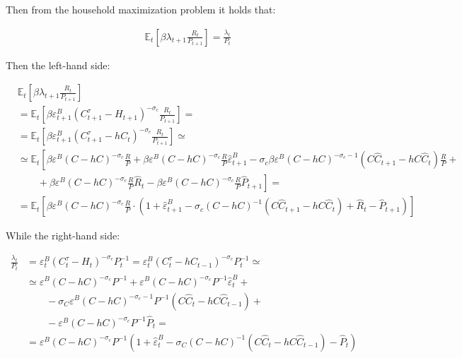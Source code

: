 \documentclass{pracamgr}
\numberwithin{equation}{section}
\begin{document}
Then from the household maximization problem it holds that:

\begin{align}
& \mathbb{E}_{t} \left[\beta \lambda_{t+1} \frac{R_{t}}{P_{t+1}} \right] = \frac{\lambda_{t}}{P_{t}} 
\end{align}

Then the left-hand side:

\begin{align}
& \mathbb{E}_{t} \left[\beta \lambda_{t+1} \frac{R_{t}}{P_{t+1}} \right]  \nonumber \\
& = \mathbb{E}_{t} \left[\beta \varepsilon_{t+1}^{B} \left( C_{t+1}^{\tau} - H_{t+1} \right)^{-\sigma_{c}} \frac{R_{t}}{P_{t+1}} \right] = \nonumber \\
& = \mathbb{E}_{t} \left[\beta \varepsilon_{t+1}^{B} \left( C_{t+1}^{\tau} - h C_{t} \right)^{-\sigma_{c}} \frac{R_{t}}{P_{t+1}} \right] \simeq \nonumber \\
& \simeq \mathbb{E}_{t} \left[\beta \varepsilon^{B} \left( C - hC \right)^{-\sigma_{c}} \frac{R}{P} +  \beta \varepsilon^{B} \left( C - hC \right)^{-\sigma_{c}} \frac{R}{P} \hat{\varepsilon}_{t+1}^{B} - \sigma_{c}\beta \varepsilon^{B} \left( C - hC \right)^{-\sigma_{c}-1} \left(C \hat{C}_{t+1} - h C \hat{C}_{t} \right) \frac{R}{P} + \right. \nonumber \\
& \left. \qquad + \beta \varepsilon^{B} \left( C - hC \right)^{-\sigma_{c}} \frac{R}{P} \hat{R}_{t} - \beta \varepsilon^{B} \left( C - hC \right)^{-\sigma_{c}} \frac{R}{P} \hat{P}_{t+1} \right] = \nonumber \\
& = \mathbb{E}_{t} \left[\beta \varepsilon^{B} \left( C - hC \right)^{-\sigma_{c}} \frac{R}{P} \cdot \left( 1 +  \hat{\varepsilon}_{t+1}^{B} - \sigma_{c} \left(C - hC \right)^{-1} \left(C \hat{C}_{t+1} - hC \hat{C}_{t} \right) + \hat{R}_{t} - \hat{P}_{t+1} \right) \right]
\end{align}

While the right-hand side:

\begin{align}
\frac{\lambda_{t}}{P_{t}} &= \varepsilon_{t}^{B} \left( C_{t}^{\tau} - H_{t} \right)^{-\sigma_{c}}  P_{t}^{-1} =  \varepsilon_{t}^{B} \left( C_{t}^{\tau} - h C_{t-1} \right)^{-\sigma_{c}}  P_{t}^{-1} \simeq \nonumber \\
& \simeq \varepsilon^{B} \left( C - h C  \right)^{-\sigma_{c}}  P^{-1} +  \varepsilon^{B} \left( C - h C  \right)^{-\sigma_{c}}  P^{-1} \hat{\varepsilon}_{t}^{B} + \nonumber \\
& \qquad - \sigma_{C} \varepsilon^{B} \left( C - h C  \right)^{-\sigma_{c}-1}  P^{-1} \left(C \hat{C}_{t} - h C \hat{C}_{t-1} \right) + \nonumber \\
& \qquad - \varepsilon^{B} \left( C - h C  \right)^{-\sigma_{c}}  P^{-1} \hat{P}_{t} = \nonumber \\
& = \varepsilon^{B} \left( C - h C  \right)^{-\sigma_{c}}  P^{-1} \left( 1 + \hat{\varepsilon}_{t}^{B} - \sigma_{C} \left( C - h C  \right)^{-1} \left(C \hat{C}_{t} - h C \hat{C}_{t-1} \right) -\hat{P}_{t}
\right)
\end{align}
\end{document}
